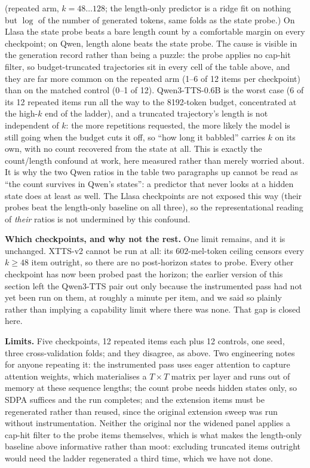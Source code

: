 \documentclass[11pt]{article}
\begin{document}
\noindent(repeated arm, $k=48\ldots128$; the length-only predictor is a ridge fit
on nothing but $\log$ of the number of generated tokens, same folds as the state
probe.) On Llasa the state probe beats a bare length count by a comfortable
margin on every checkpoint; on Qwen, length alone beats the state probe. The
cause is visible in the generation record rather than being a puzzle: the probe
applies no cap-hit filter, so budget-truncated trajectories sit in every cell of
the table above, and they are far more common on the repeated arm (1--6 of 12
items per checkpoint) than on the matched control (0--1 of 12). Qwen3-TTS-0.6B is
the worst case (6 of its 12 repeated items run all the way to the 8192-token
budget, concentrated at the high-$k$ end of the ladder), and a truncated
trajectory's length is not independent of $k$: the more repetitions requested,
the more likely the model is still going when the budget cuts it off, so ``how
long it babbled'' carries $k$ on its own, with no count recovered from the state
at all. This is exactly the count/length confound at work, here measured
rather than merely worried about. It is why the two Qwen ratios in the table
two paragraphs up cannot be read as ``the count survives in Qwen's states'': a
predictor that never looks at a hidden state does at least as well. The Llasa
checkpoints are not exposed this way (their probes beat the length-only
baseline on all three), so the representational reading of \emph{their} ratios
is not undermined by this confound.

\noindent\textbf{Which checkpoints, and why not the rest.} One limit remains, and
it is unchanged. XTTS-v2 cannot be run at all: its $602$-mel-token ceiling
censors every $k\ge48$ item outright, so there are no post-horizon states to
probe. Every other checkpoint has now been probed past the horizon; the earlier
version of this section left the Qwen3-TTS pair out only because the instrumented
pass had not yet been run on them, at roughly a minute per item, and we said so
plainly rather than implying a capability limit where there was none. That gap is
closed here.

\noindent\textbf{Limits.} Five checkpoints, 12 repeated items each plus 12
controls, one seed, three cross-validation folds; and they disagree, as above.
Two engineering notes for anyone repeating it: the instrumented pass uses eager
attention to capture attention weights, which materialises a $T\times T$ matrix
per layer and runs out of memory at these sequence lengths; the count probe
needs hidden states only, so SDPA suffices and the run completes; and the
extension items must be regenerated rather than reused, since the original
extension sweep was run without instrumentation. Neither the original nor the
widened panel applies a cap-hit filter to the probe items themselves, which is
what makes the length-only baseline above informative rather than moot:
excluding truncated items outright would need the ladder regenerated a third
time, which we have not done.
\end{document}
